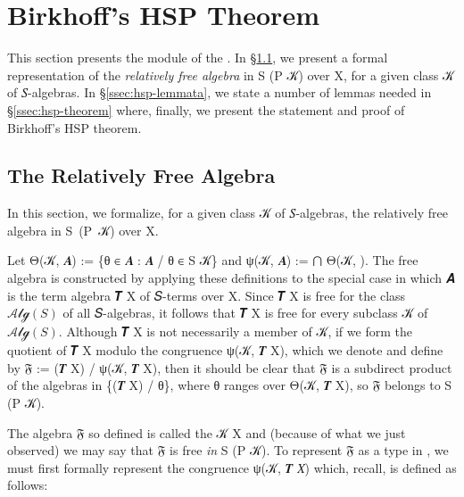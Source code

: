 \documentclass[a4paper,UKenglish,cleveref,autoref,thm-restate]{lipics-v2021}
\begin{document}

\section{Birkhoff's HSP Theorem}\label{sec:birkhoff}
This section presents the \ualibBirkhoff module of  the \agdaualib. In \S\ref{ssec:relatively-free-algebra-type}, we present a formal representation of the \emph{relatively free algebra} in \ad S (\ad P \ab 𝒦) over \ab X, for a given class \ab 𝒦 of \ab 𝑆-algebras. In \S\ref{ssec:hsp-lemmata}, we state a number of lemmas needed in \S\ref{ssec:hsp-theorem} where, finally, we present the statement and proof of Birkhoff's HSP theorem.

\subsection{The Relatively Free Algebra}\label{ssec:relatively-free-algebra-type}
In this section, we formalize, for a given class \ab 𝒦 of \ab 𝑆-algebras, the relatively free algebra in \ad S~(\ad P~\ab 𝒦) over \ab X.

Let \af Θ(\ab 𝒦, \ab 𝑨) := \{\ab θ \af ∈  \ab 𝑨 \as : \ab 𝑨 \af / \ab θ \af ∈ \ad S \ab 𝒦\} and \af ψ(\ab 𝒦, \ab 𝑨) := \af ⋂ \af Θ(\ab 𝒦, ).
The free algebra is constructed by applying these definitions to the special case in which \ab 𝑨 is the term algebra \af 𝑻 \ab X of \ab 𝑆-terms over \ab X.  Since \af 𝑻 \ab X is free for the class $𝒜𝓁ℊ(𝑆)$ of all \ab 𝑆-algebras, it follows that \af 𝑻 \ab X is free for every subclass \ab 𝒦 of $𝒜𝓁ℊ(𝑆)$. Although \af 𝑻 \ab X is not necessarily a member of \ab 𝒦, if we form the quotient of \af 𝑻 \ab X modulo the congruence \af ψ(\ab 𝒦, \af 𝑻 \ab X), which we denote and define by \af 𝔉 \as := (\ab 𝑻 \ab X) \af / \af ψ(\ab 𝒦, \af 𝑻 \ab X), then it should be clear that \af 𝔉 is a subdirect product of the algebras in \{(\af 𝑻 \ab X) \af / \ab θ\}, where \ab θ ranges over \af Θ(\ab 𝒦, \af 𝑻 \ab X), so \af 𝔉 belongs to \ad S (\ad P \ab 𝒦).

The algebra \af 𝔉 so defined is called the  \ab 𝒦  \ab X and (because of what we just observed) we may say that \af 𝔉 is free \emph{in} \ad S (\ad P \ab 𝒦). To represent \af 𝔉 as a type in \agda, we must first formally represent the congruence \af ψ(\ab 𝒦, \af 𝑻 \ab 𝑋) which, recall, is defined as follows:\\
\end{document}
